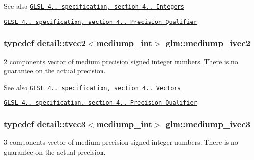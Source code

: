 \begin{DoxySeeAlso}{\-See also}
\href{http://www.opengl.org/registry/doc/GLSLangSpec.4.20.8.pdf}{\tt \-G\-L\-S\-L 4.. specification, section 4.. \-Integers} 

\href{http://www.opengl.org/registry/doc/GLSLangSpec.4.20.8.pdf}{\tt \-G\-L\-S\-L 4.. specification, section 4.. \-Precision \-Qualifier} 
\end{DoxySeeAlso}
\hypertarget{group__core__precision_ga4803c44369a1aea2e7e51397c341ce6f}{
\subsubsection[{mediump\-\_\-ivec2}]{\setlength{\rightskip}{0pt plus 5cm}typedef detail\-::tvec2$<$mediump\-\_\-int$>$ {\bf glm\-::mediump\-\_\-ivec2}}}\label{group__core__precision_ga4803c44369a1aea2e7e51397c341ce6f}
2 components vector of medium precision signed integer numbers. \-There is no guarantee on the actual precision.

\begin{DoxySeeAlso}{\-See also}
\href{http://www.opengl.org/registry/doc/GLSLangSpec.4.20.8.pdf}{\tt \-G\-L\-S\-L 4.. specification, section 4.. \-Vectors} 

\href{http://www.opengl.org/registry/doc/GLSLangSpec.4.20.8.pdf}{\tt \-G\-L\-S\-L 4.. specification, section 4.. \-Precision \-Qualifier} 
\end{DoxySeeAlso}
\hypertarget{group__core__precision_gab824e682bc463998efbcd4a512ebf209}{
\subsubsection[{mediump\-\_\-ivec3}]{\setlength{\rightskip}{0pt plus 5cm}typedef detail\-::tvec3$<$mediump\-\_\-int$>$ {\bf glm\-::mediump\-\_\-ivec3}}}\label{group__core__precision_gab824e682bc463998efbcd4a512ebf209}
3 components vector of medium precision signed integer numbers. \-There is no guarantee on the actual precision.

